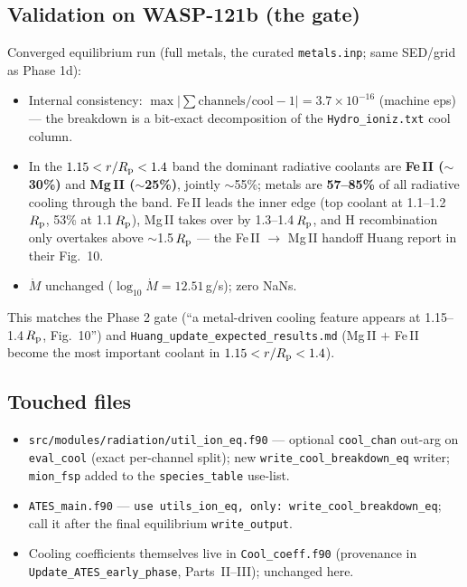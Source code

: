\documentclass[english,a4paper]{kiseon_memo}
\begin{document}
\subsection{Validation on WASP-121b (the gate)}

Converged equilibrium run (full metals, the curated \texttt{metals.inp}; same
SED/grid as Phase 1d):
\begin{itemize}
  \item Internal consistency:
    \(\max|\sum\text{channels}/\text{cool}-1| = 3.7\times10^{-16}\) (machine eps)
    --- the breakdown is a bit-exact decomposition of the
    \texttt{Hydro\_ioniz.txt} cool column.
  \item In the \textbf{\(1.15 < r/R_{\rm p} < 1.4\)} band the dominant radiative
    coolants are \textbf{Fe\,II (\(\sim\)30\%)} and \textbf{Mg\,II
    (\(\sim\)25\%)}, jointly \(\sim\)55\%; metals are \textbf{57--85\%} of all
    radiative cooling through the band. Fe\,II leads the inner edge (top coolant
    at 1.1--1.2\,\(R_{\rm p}\), 53\% at 1.1\,\(R_{\rm p}\)), Mg\,II takes over by
    1.3--1.4\,\(R_{\rm p}\), and H recombination only overtakes above
    \(\sim\)1.5\,\(R_{\rm p}\) --- the Fe\,II \(\rightarrow\) Mg\,II handoff Huang
    report in their Fig.~10.
  \item \(\dot{M}\) unchanged (\(\log_{10}\dot{M}=12.51\)\,g/s); zero NaNs.
\end{itemize}
This matches the Phase 2 gate (``a metal-driven cooling feature appears at
1.15--1.4\,\(R_{\rm p}\), Fig.~10'') and
\texttt{Huang\_update\_expected\_results.md} (Mg\,II $+$ Fe\,II become the most
important coolant in \(1.15 < r/R_{\rm p} < 1.4\)).

\subsection{Touched files}
\begin{itemize}
  \item \texttt{src/modules/radiation/util\_ion\_eq.f90} --- optional
    \verb|cool_chan| out-arg on \verb|eval_cool| (exact per-channel split); new
    \verb|write_cool_breakdown_eq| writer; \verb|mion_fsp| added to the
    \texttt{species\_table} use-list.
  \item \texttt{ATES\_main.f90} ---
    \verb|use utils_ion_eq, only: write_cool_breakdown_eq|; call it after the
    final equilibrium \verb|write_output|.
  \item Cooling coefficients themselves live in \texttt{Cool\_coeff.f90}
    (provenance in \texttt{Update\_ATES\_early\_phase}, Parts~II--III); unchanged here.
\end{itemize}
\end{document}
